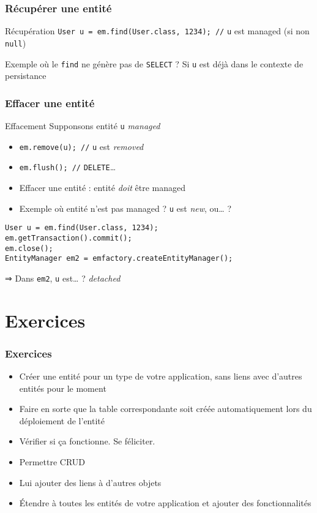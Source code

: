 \documentclass[english, french]{beamer}
\begin{document}
\begin{frame}
	\frametitle{Récupérer une entité}
	\begin{exampleblock}{Récupération}
		\texttt{User u = em.find(User.class, 1234); //} \texttt{u} est managed {\tiny (si non \texttt{null})}
	\end{exampleblock}
	Exemple où le \texttt{find} ne génère pas de \texttt{SELECT} ? \pause Si \texttt{u} est déjà dans le contexte de persistance
\end{frame}

\begin{frame}[fragile]
	\frametitle{Effacer une entité}
	\begin{exampleblock}{Effacement}
		Supponsons entité \texttt{u} \emph{managed}
		\begin{itemize}
			\item \texttt{em.remove(u); //} \texttt{u} est \emph{removed}
			\item \texttt{em.flush(); //} \texttt{DELETE}…
		\end{itemize}
	\end{exampleblock}
	\begin{itemize}
		\item Effacer une entité : entité \emph{doit} être \og{}managed\fg{}
		\item Exemple où entité n’est pas \og{}managed\fg{} ? \pause \texttt{u} est \emph{new}, ou… ?
	\end{itemize}
	\begin{lstlisting}
User u = em.find(User.class, 1234);
em.getTransaction().commit();
em.close();
EntityManager em2 = emfactory.createEntityManager();
	\end{lstlisting}
	⇒ Dans \texttt{em2}, \texttt{u} est… ? \pause \emph{detached} 
\end{frame}

\section{Exercices}
\begin{frame}
	\frametitle{Exercices}
	\begin{itemize}
		\item Créer une entité pour un type de votre application, sans liens avec d’autres entités pour le moment
		\item Faire en sorte que la table correspondante soit créée automatiquement lors du déploiement de l’entité
		\item Vérifier si ça fonctionne. Se féliciter.
		\item Permettre CRUD
		\item Lui ajouter des liens à d’autres objets
		\item Étendre à toutes les entités de votre application et ajouter des fonctionnalités
	\end{itemize}
\end{frame}
\end{document}
